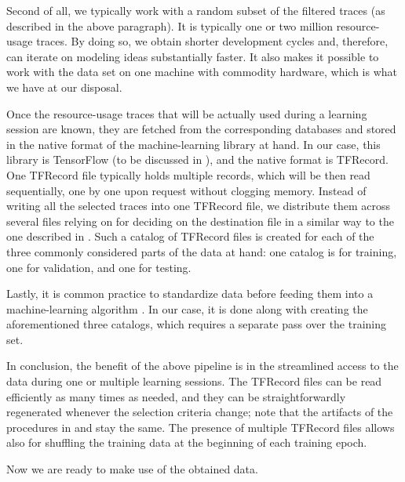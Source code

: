 Second of all, we typically work with a random subset of the filtered traces (as
described in the above paragraph). It is typically one or two million
resource-usage traces. By doing so, we obtain shorter development cycles and,
therefore, can iterate on modeling ideas substantially faster. It also makes it
possible to work with the data set on one machine with commodity hardware, which
is what we have at our disposal.

Once the resource-usage traces that will be actually used during a learning
session are known, they are fetched from the corresponding databases and stored
in the native format of the machine-learning library at hand. In our case, this
library is TensorFlow \cite{abadi2015} (to be discussed in ), and
the native format is TFRecord. One TFRecord file typically holds multiple
records, which will be then read sequentially, one by one upon request without
clogging memory. Instead of writing all the selected traces into one TFRecord
file, we distribute them across several files relying on  for deciding
on the destination file in a similar way to the one described in
. Such a catalog of TFRecord files is created for each of the
three commonly considered parts \cite{hastie2009} of the data at hand: one
catalog is for training, one for validation, and one for testing.

Lastly, it is common practice to standardize data before feeding them into a
machine-learning algorithm \cite{hastie2009}. In our case, it is done along with
creating the aforementioned three catalogs, which requires a separate pass over
the training set.

In conclusion, the benefit of the above pipeline is in the streamlined access to
the data during one or multiple learning sessions. The TFRecord files can be
read efficiently as many times as needed, and they can be straightforwardly
regenerated whenever the selection criteria change; note that the artifacts of
the procedures in  and  stay the same. The
presence of multiple TFRecord files allows also for shuffling the training data
at the beginning of each training epoch.

Now we are ready to make use of the obtained data.
